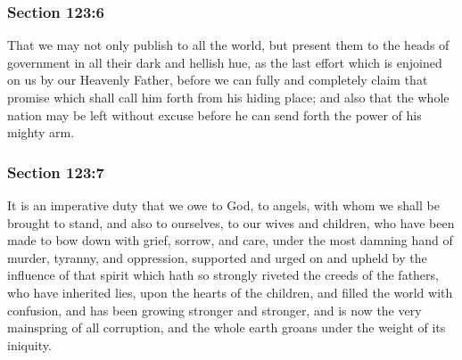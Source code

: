 	\subsubsection{Section 123:6} %
		\label{DC123-6}

		That we may not only publish to all the world, but present them to the heads of government in all their dark and hellish hue, as the last effort which is enjoined on us by our Heavenly Father, before we can fully and completely claim that promise which shall call him forth from his hiding place; and also that the whole nation may be left without excuse before he can send forth the power of his mighty arm.


	\subsubsection{Section 123:7} %
		\label{DC123-7}

		It is an imperative duty that we owe to God, to angels, with whom we shall be brought to stand, and also to ourselves, to our wives and children, who have been made to bow down with grief, sorrow, and care, under the most damning hand of murder, tyranny, and oppression, supported and urged on and upheld by the influence of that spirit which hath so strongly riveted the creeds of the fathers, who have inherited lies, upon the hearts of the children, and filled the world with confusion, and has been growing stronger and stronger, and is now the very mainspring of all corruption, and the whole earth groans under the weight of its iniquity.


